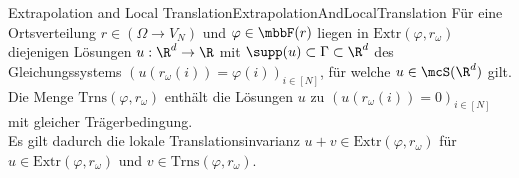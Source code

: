 \begin{mdef}{Extrapolation and Local Translation}{ExtrapolationAndLocalTranslation}
    Für eine Ortsverteilung $r\in(\Omega\to V_N)$ und $\varphi\in\mbbF(r)$ liegen in $\text{Extr}(\varphi,r_\omega)$ diejenigen Lösungen $u:\R^d\to\R$ mit $\supp(u)\subset \Gamma\subset\R^d$ des Gleichungssystems $(u(r_\omega(i)) = \varphi(i))_{i\in[N]}$, für welche $u\in \mcS(\R^d)$ gilt. Die Menge $\text{Trns}(\varphi,r_\omega)$ enthält die Lösungen $u$ zu $(u(r_\omega(i)) = 0)_{i\in[N]}$ mit gleicher Trägerbedingung. \\
    
    Es gilt dadurch die lokale Translationsinvarianz $u + v\in \text{Extr}(\varphi,r_\omega)$ für $u\in\text{Extr}(\varphi,r_\omega)$ und $v\in\text{Trns}(\varphi,r_\omega)$.
\end{mdef}